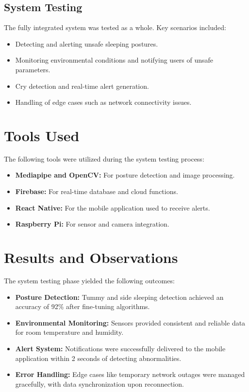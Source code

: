 \documentclass[12pt,a4paper]{report}
\begin{document}
\subsection{System Testing}
The fully integrated system was tested as a whole. Key scenarios included:
\begin{itemize}
    \item Detecting and alerting unsafe sleeping postures.
    \item Monitoring environmental conditions and notifying users of unsafe parameters.
    \item Cry detection and real-time alert generation.
    \item Handling of edge cases such as network connectivity issues.
\end{itemize}

\section{Tools Used}
The following tools were utilized during the system testing process:
\begin{itemize}
    \item \textbf{Mediapipe and OpenCV:} For posture detection and image processing.
    \item \textbf{Firebase:} For real-time database and cloud functions.
    \item \textbf{React Native:} For the mobile application used to receive alerts.
    \item \textbf{Raspberry Pi:} For sensor and camera integration.
\end{itemize}

\section{Results and Observations}
The system testing phase yielded the following outcomes:
\begin{itemize}
    \item \textbf{Posture Detection:} Tummy and side sleeping detection achieved an accuracy of 92\% after fine-tuning algorithms.
    \item \textbf{Environmental Monitoring:} Sensors provided consistent and reliable data for room temperature and humidity.
    \item \textbf{Alert System:} Notifications were successfully delivered to the mobile application within 2 seconds of detecting abnormalities.
    \item \textbf{Error Handling:} Edge cases like temporary network outages were managed gracefully, with data synchronization upon reconnection.
\end{itemize}
\end{document}
